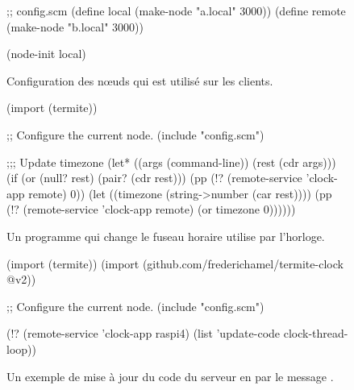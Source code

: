 \begin{figure}[h!]
\begin{center}
\begin{mplisting}{1}
;; config.scm
(define local (make-node "a.local" 3000))
(define remote (make-node "b.local" 3000))

(node-init local)
\end{mplisting}
\end{center}
  \caption{Configuration des nœuds qui est utilisé sur les clients.}
  \vspace*{4ex}
\end{figure}

\begin{figure}[h!]
\begin{center}
\begin{mplisting}{1}
(import (termite))

;; Configure the current node.
(include "config.scm")

;;; Update timezone
(let* ((args (command-line))
       (rest (cdr args)))
  (if (or (null? rest)
          (pair? (cdr rest)))
      (pp (!? (remote-service 'clock-app remote) 0))
      (let ((timezone (string->number (car rest))))
        (pp (!? (remote-service 'clock-app remote) (or timezone 0))))))
\end{mplisting}
\end{center}
  \caption{Un programme qui change le fuseau horaire utilise par
    l'horloge.}
  \vspace*{4ex}
\end{figure}

\begin{figure}[h!]
\begin{center}
\begin{mplisting}{1}
(import (termite))
(import (github.com/frederichamel/termite-clock @v2))

;; Configure the current node.
(include "config.scm")

(!? (remote-service 'clock-app raspi4)
    (list 'update-code clock-thread-loop))
\end{mplisting}
\end{center}
  \caption{Un exemple de mise à jour du code du serveur en
    par le message .}
  \vspace*{4ex}
\end{figure}


